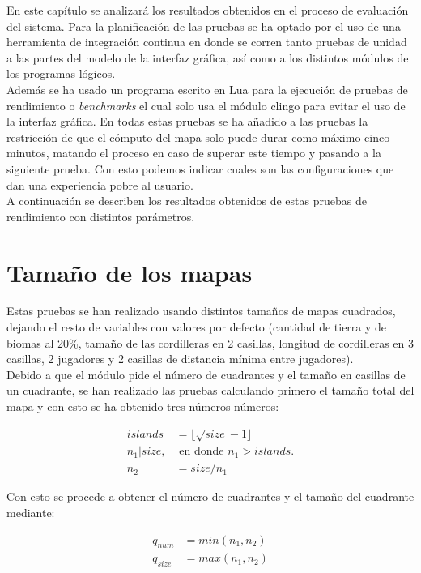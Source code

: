 En este capítulo se analizará los resultados obtenidos en el proceso de evaluación del sistema. Para la planificación de las pruebas se ha optado por el uso de una herramienta de integración continua en donde se corren tanto pruebas de unidad a las partes del modelo de la interfaz gráfica, así como a los distintos módulos de los programas lógicos. \\

Además se ha usado un programa escrito en Lua para la ejecución de pruebas de rendimiento o \textit{benchmarks} el cual solo usa el módulo clingo para evitar el uso de la interfaz gráfica. En todas estas pruebas se ha añadido a las pruebas la restricción de que el cómputo del mapa solo puede durar como máximo cinco minutos, matando el proceso en caso de superar este tiempo y pasando a la siguiente prueba. Con esto podemos indicar cuales son las configuraciones que dan una experiencia pobre al usuario. \\

A continuación se describen los resultados obtenidos de estas pruebas de rendimiento con distintos parámetros. \\

\section{Tamaño de los mapas}

Estas pruebas se han realizado usando distintos tamaños de mapas cuadrados, dejando el resto de variables con valores por defecto (cantidad de tierra y de biomas al 20\%, tamaño de las cordilleras en 2 casillas, longitud de cordilleras en 3 casillas, 2 jugadores y 2 casillas de distancia mínima entre jugadores). \\

Debido a que el módulo pide el número de cuadrantes y el tamaño en casillas de un cuadrante, se han realizado las pruebas calculando primero el tamaño total del mapa y con esto se ha obtenido tres números números:

\begin{align}
	islands &= \lfloor \sqrt{size} - 1 \rfloor \\
	n_1 | size, & \text{ en donde } n_1 > islands. \\
	n_2 &= size / n_1
\end{align}

Con esto se procede a obtener el número de cuadrantes y el tamaño del cuadrante mediante:

\begin{align}
	q_{num} &= min(n_1, n_2) \\
	q_{size} &= max(n_1, n_2) \\
\end{align}

